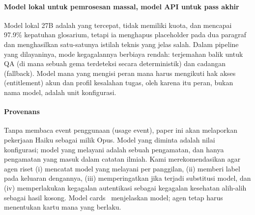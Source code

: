 \paragraph{Model lokal untuk pemrosesan massal, model API untuk pass akhir}
Model lokal 27B adalah yang tercepat, tidak memiliki kuota, dan mencapai 97.9\% kepatuhan glosarium, tetapi ia menghapus placeholder pada dua paragraf dan menghasilkan satu-satunya istilah teknis yang jelas salah. Dalam pipeline yang dilayaninya, mode kegagalannya berbiaya rendah: terjemahan balik untuk QA (di mana sebuah gema terdeteksi secara deterministik) dan cadangan (fallback). Model mana yang mengisi peran mana harus mengikuti hak akses (entitlement) akun dan profil kesalahan tugas, oleh karena itu peran, bukan nama model, adalah unit konfigurasi.

\paragraph{Provenans}
Tanpa membaca event penggunaan (usage event), paper ini akan melaporkan pekerjaan Haiku sebagai milik Opus. Model yang diminta adalah nilai konfigurasi; model yang melayani adalah sebuah pengamatan, dan hanya pengamatan yang masuk dalam catatan ilmiah. Kami merekomendasikan agar agen riset (i) mencatat model yang melayani per panggilan, (ii) memberi label pada keluaran dengannya, (iii) memperingatkan jika terjadi substitusi model, dan (iv) memperlakukan kegagalan autentikasi sebagai kegagalan kesehatan alih-alih sebagai hasil kosong. Model cards~\cite{mitchell2019modelcards} menjelaskan model; agen tetap harus menentukan kartu mana yang berlaku.
